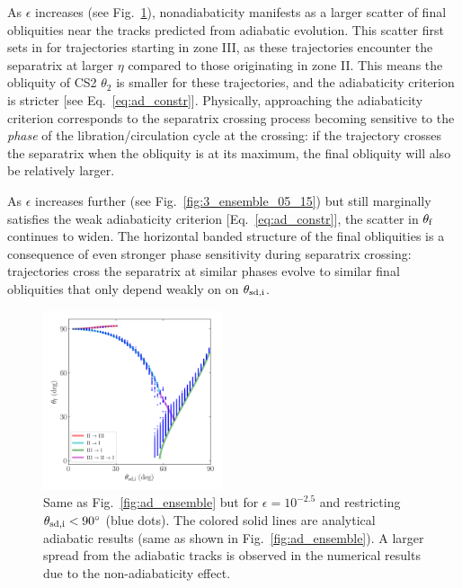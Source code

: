 As $\epsilon$ increases (see Fig.~\ref{fig:3_ensemble_05_25}), nonadiabaticity
manifests as a larger scatter of final obliquities near the tracks predicted
from adiabatic evolution. This scatter first sets in for trajectories starting
in zone III, as these trajectories encounter the separatrix at larger $\eta$
compared to those originating in zone II\@. This means the obliquity of CS2
$\theta_2$ is smaller for these trajectories, and the adiabaticity criterion is
stricter [see Eq.~\eqref{eq:ad_constr}]. Physically, approaching the
adiabaticity criterion corresponds to the separatrix crossing process becoming
sensitive to the \emph{phase} of the libration/circulation cycle at the
crossing: if the trajectory crosses the separatrix when the obliquity is at its
maximum, the final obliquity will also be relatively larger.

As $\epsilon$ increases further (see Fig.~\ref{fig:3_ensemble_05_15}) but still
marginally satisfies the weak adiabaticity criterion [Eq.~\eqref{eq:ad_constr}],
the scatter in $\theta_{\rm f}$ continues to widen. The horizontal banded
structure of the final obliquities is a consequence of even stronger phase
sensitivity during separatrix crossing: trajectories cross the separatrix at
similar phases evolve to similar final obliquities that only depend weakly on
on $\theta_{\rm sd, i}$.

\begin{figure}
    \centering
    \includegraphics[width=0.47\textwidth]{plots_diskdisp/3_ensemble_05_25.png}
    \caption{Same as Fig.~\ref{fig:ad_ensemble} but for $\epsilon = 10^{-2.5}$
    and restricting $\theta_{\rm sd, i} < 90^\circ$ (blue dots). The colored
    solid lines are analytical adiabatic results (same as shown in
    Fig.~\ref{fig:ad_ensemble}). A larger spread from the adiabatic tracks is
    observed in the numerical results due to the non-adiabaticity effect.
    }\label{fig:3_ensemble_05_25}
\end{figure}

